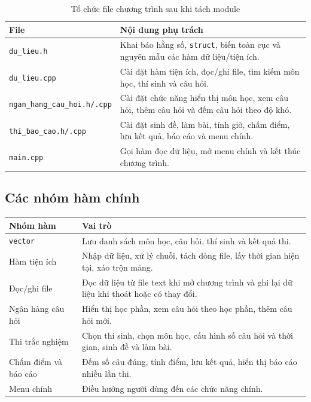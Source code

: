 \documentclass[12pt,a4paper]{article}
\begin{document}
\begin{table}[H]
\centering
\begin{tabular}{|p{4cm}|p{10cm}|}
\hline
\textbf{File} & \textbf{Nội dung phụ trách} \\
\hline
\texttt{du\_lieu.h} & Khai báo hằng số, \texttt{struct}, biến toàn cục và nguyên mẫu các hàm dữ liệu/tiện ích. \\
\hline
\texttt{du\_lieu.cpp} & Cài đặt hàm tiện ích, đọc/ghi file, tìm kiếm môn học, thí sinh và câu hỏi. \\
\hline
\texttt{ngan\_hang\_cau\_hoi.h/.cpp} & Cài đặt chức năng hiển thị môn học, xem câu hỏi, thêm câu hỏi và đếm câu hỏi theo độ khó. \\
\hline
\texttt{thi\_bao\_cao.h/.cpp} & Cài đặt sinh đề, làm bài, tính giờ, chấm điểm, lưu kết quả, báo cáo và menu chính. \\
\hline
\texttt{main.cpp} & Gọi hàm đọc dữ liệu, mở menu chính và kết thúc chương trình. \\
\hline
\end{tabular}
\caption{Tổ chức file chương trình sau khi tách module}
\end{table}

\subsection{Các nhóm hàm chính}

\begin{longtable}{|p{5cm}|p{9cm}|}
\hline
\textbf{Nhóm hàm} & \textbf{Vai trò} \\
\hline
\texttt{vector} & Lưu danh sách môn học, câu hỏi, thí sinh và kết quả thi. \\
\hline
Hàm tiện ích & Nhập dữ liệu, xử lý chuỗi, tách dòng file, lấy thời gian hiện tại, xáo trộn mảng. \\
\hline
Đọc/ghi file & Đọc dữ liệu từ file text khi mở chương trình và ghi lại dữ liệu khi thoát hoặc có thay đổi. \\
\hline
Ngân hàng câu hỏi & Hiển thị học phần, xem câu hỏi theo học phần, thêm câu hỏi mới. \\
\hline
Thi trắc nghiệm & Chọn thí sinh, chọn môn học, cấu hình số câu hỏi và thời gian, sinh đề và làm bài. \\
\hline
Chấm điểm và báo cáo & Đếm số câu đúng, tính điểm, lưu kết quả, hiển thị báo cáo nhiều lần thi. \\
\hline
Menu chính & Điều hướng người dùng đến các chức năng chính. \\
\hline
\end{longtable}
\end{document}
